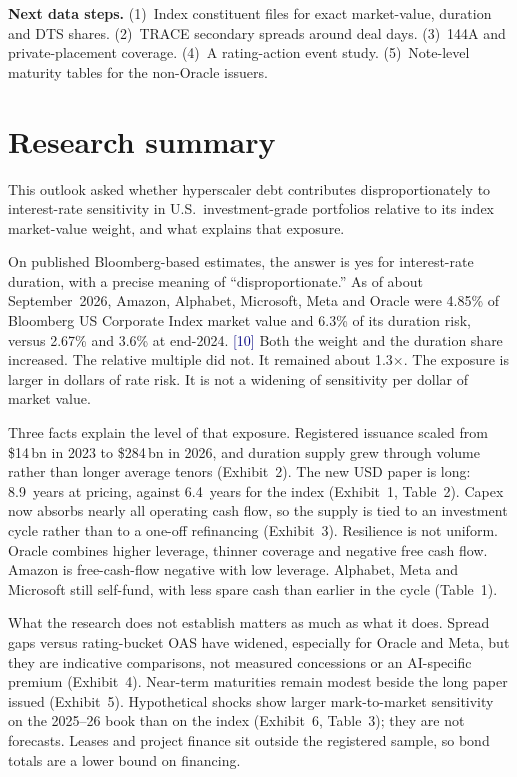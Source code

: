 \documentclass[10pt,letterpaper]{article}
\newcommand{\src}[1]{{\scriptsize\textcolor{navy}{[#1]}}}
\begin{document}
\vspace{0.15em}
{\scriptsize\color{muted}\textbf{Next data steps.}
(1)~Index constituent files for exact market-value, duration and DTS shares.
(2)~TRACE secondary spreads around deal days.
(3)~144A and private-placement coverage.
(4)~A rating-action event study.
(5)~Note-level maturity tables for the non-Oracle issuers.}

\section{Research summary}

This outlook asked whether hyperscaler debt contributes disproportionately to interest-rate sensitivity in U.S.\ investment-grade portfolios relative to its index market-value weight, and what explains that exposure.

On published Bloomberg-based estimates, the answer is yes for interest-rate duration, with a precise meaning of ``disproportionate.'' As of about September~2026, Amazon, Alphabet, Microsoft, Meta and Oracle were 4.85\% of Bloomberg US Corporate Index market value and 6.3\% of its duration risk, versus 2.67\% and 3.6\% at end-2024. \src{10} Both the weight and the duration share increased. The relative multiple did not. It remained about 1.3$\times$. The exposure is larger in dollars of rate risk. It is not a widening of sensitivity per dollar of market value.

Three facts explain the level of that exposure. Registered issuance scaled from \$14\,bn in 2023 to \$284\,bn in 2026, and duration supply grew through volume rather than longer average tenors (Exhibit~2). The new USD paper is long: 8.9~years at pricing, against 6.4~years for the index (Exhibit~1, Table~2). Capex now absorbs nearly all operating cash flow, so the supply is tied to an investment cycle rather than to a one-off refinancing (Exhibit~3). Resilience is not uniform. Oracle combines higher leverage, thinner coverage and negative free cash flow. Amazon is free-cash-flow negative with low leverage. Alphabet, Meta and Microsoft still self-fund, with less spare cash than earlier in the cycle (Table~1).

What the research does not establish matters as much as what it does. Spread gaps versus rating-bucket OAS have widened, especially for Oracle and Meta, but they are indicative comparisons, not measured concessions or an AI-specific premium (Exhibit~4). Near-term maturities remain modest beside the long paper issued (Exhibit~5). Hypothetical shocks show larger mark-to-market sensitivity on the 2025--26 book than on the index (Exhibit~6, Table~3); they are not forecasts. Leases and project finance sit outside the registered sample, so bond totals are a lower bound on financing.
\end{document}
